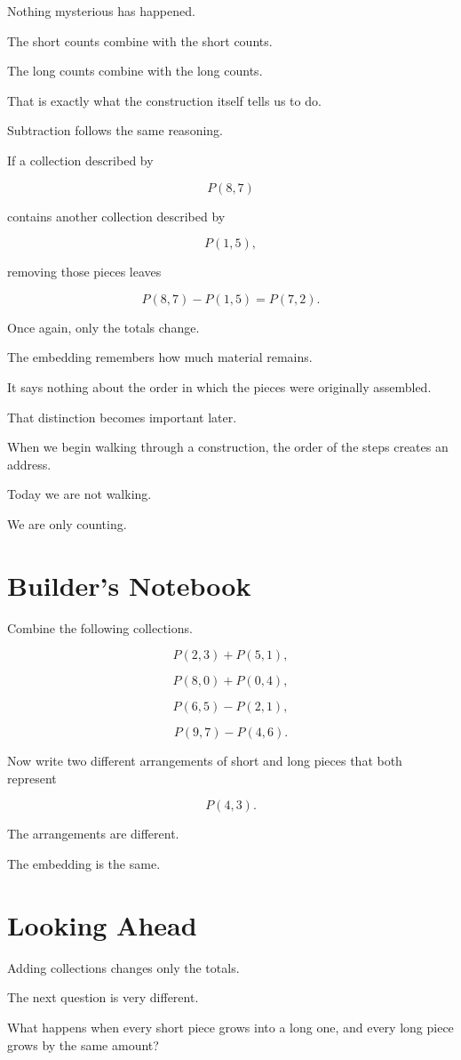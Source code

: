 Nothing mysterious has happened.

The short counts combine with the short counts.

The long counts combine with the long counts.

That is exactly what the construction itself tells us to do.

Subtraction follows the same reasoning.

If a collection described by

\[
P(8,7)
\]

contains another collection described by

\[
P(1,5),
\]

removing those pieces leaves

\[
P(8,7)-P(1,5)=P(7,2).
\]

Once again, only the totals change.

The embedding remembers how much material remains.

It says nothing about the order in which the pieces were originally assembled.

That distinction becomes important later.

When we begin walking through a construction, the order of the steps creates an address.

Today we are not walking.

We are only counting.

\section*{Builder's Notebook}

Combine the following collections.

\[
P(2,3)+P(5,1),
\]

\[
P(8,0)+P(0,4),
\]

\[
P(6,5)-P(2,1),
\]

\[
P(9,7)-P(4,6).
\]

Now write two different arrangements of short and long pieces that both represent

\[
P(4,3).
\]

The arrangements are different.

The embedding is the same.

\section*{Looking Ahead}

Adding collections changes only the totals.

The next question is very different.

What happens when every short piece grows into a long one, and every long piece grows by the same amount?
